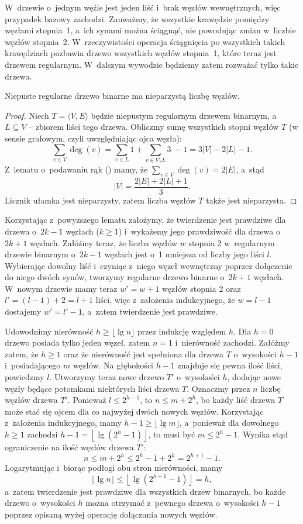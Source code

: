 \exercise %
W~drzewie o~jednym węźle jest jeden liść i~brak węzłów wewnętrznych, więc przypadek bazowy zachodzi. Zauważmy, że wszystkie krawędzie pomiędzy węzłami stopnia~1, a~ich synami można ściągnąć, nie powodując zmian w~liczbie węzłów stopnia~2. W~rzeczywistości operacja ściągnięcia po wszystkich takich krawędziach pozbawia drzewo wszystkich węzłów stopnia~1, które teraz jest drzewem regularnym. W~dalszym wywodzie będziemy zatem rozważać tylko takie drzewa.
\begin{lemat}
	Niepuste regularne drzewo binarne ma nieparzystą liczbę węzłów.
\end{lemat}
\begin{proof}
Niech $T=\langle V,E\rangle$ będzie niepustym regularnym drzewem binarnym, a~$L\subseteq V$ -- zbiorem liści tego drzewa. Obliczmy sumę wszystkich stopni węzłów $T$ (w sensie grafowym, czyli uwzględniając ojca węzła):
\[
	\sum_{v\in V}\deg(v) = \sum_{v\in L}1+\sum_{v\in V\setminus L}\!\!\!3\;-1=3|V|-2|L|-1.
\]
Z~lematu o~podawaniu rąk () mamy, że $\sum_{v\in V}\deg(v) = 2|E|$, a~stąd
\[
	|V| = \frac{2|E|+2|L|+1}{3}.
\]
Licznik ułamka jest nieparzysty, zatem liczba węzłów $T$ także jest nieparzysta.
\end{proof}

Korzystając z~powyższego lematu założymy, że twierdzenie jest prawdziwe dla drzewa o~$2k-1$ węzłach ($k\ge1$) i~wykażemy jego prawdziwość dla drzewa o~$2k+1$ węzłach. Załóżmy teraz, że liczba węzłów $w$ stopnia 2 w~regularnym drzewie binarnym o~$2k-1$ węzłach jest o~1 mniejsza od liczby jego liści $l$. Wybierając dowolny liść i~czyniąc z~niego węzeł wewnętrzny poprzez dołączenie do niego dwóch synów, tworzymy regularne drzewo binarne o~$2k+1$ węzłach. W~nowym drzewie mamy teraz $w'=w+1$ węzłów stopnia 2 oraz $l'=(l-1)+2=l+1$ liści, więc z~założenia indukcyjnego, że $w=l-1$ dostajemy $w'=l'-1$, a~zatem twierdzenie jest prawdziwe.

\exercise %
Udowodnimy nierówność $h\ge\lfloor\lg n\rfloor$ przez indukcję względem $h$. Dla $h=0$ drzewo posiada tylko jeden węzeł, zatem $n=1$ i~nierówność zachodzi. Załóżmy zatem, że $h\ge1$ oraz że nierówność jest spełniona dla drzewa $T$ o~wysokości $h-1$ i~posiadającego $m$ węzłów. Na głębokości $h-1$ znajduje się pewna ilość liści, powiedzmy $l$. Utworzymy teraz nowe drzewo $T'$ o~wysokości $h$, dodając nowe węzły będące potomkami niektórych liści drzewa $T$. Oznaczmy przez $n$ liczbę węzłów drzewa $T'$. Ponieważ $l\le2^{h-1}$, to $n\le m+2^h$, bo każdy liść drzewa $T$ może stać się ojcem dla co najwyżej dwóch nowych węzłów. Korzystając z~założenia indukcyjnego, mamy $h-1\ge\lfloor\lg m\rfloor$, a~ponieważ dla dowolnego $h\ge1$ zachodzi $h-1=\left\lfloor\lg(2^h-1)\right\rfloor$, to musi być $m\le 2^h-1$. Wynika stąd ograniczenie na ilość węzłów drzewa $T'$:
\[
	n \le m+2^h \le 2^h-1+2^h = 2^{h+1}-1.
\]
Logarytmując i~biorąc podłogi obu stron nierówności, mamy
\[
	\lfloor\lg n\rfloor \le \left\lfloor\lg(2^{h+1}-1)\right\rfloor = h,
\]
a~zatem twierdzenie jest prawdziwe dla wszystkich drzew binarnych, bo każde drzewo o~wysokości $h$ można otrzymać z~pewnego drzewa o~wysokości $h-1$ poprzez opisaną wyżej operację dołączania nowych węzłów.

